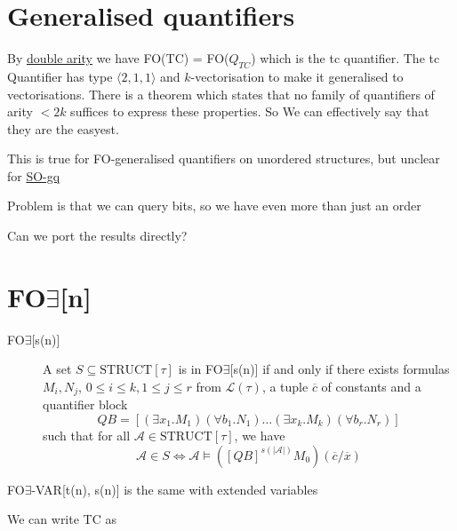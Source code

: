 \section{Generalised quantifiers}\label{generalised-quantifiers}

By \href{https://link.springer.com/article/10.1007/bf01268616}{double
arity} we have FO(TC) = FO(\(Q_{TC}\)) which is the tc quantifier. The
tc Quantifier has type \(\langle 2, 1 ,1 \rangle\) and
\(k\)-vectorisation to make it generalised to vectorisations. There is a
theorem which states that no family of quantifiers of arity \(<2k\)
suffices to express these properties. So We can effectively say that
they are the easyest.

This is true for FO-generalised quantifiers on unordered structures, but
unclear for \href{https://core.ac.uk/download/pdf/81931656.pdf}{SO-gq}

Problem is that we can query bits, so we have even more than just an
order

Can we port the results directly?

\section{\texorpdfstring{FO\(\exists\){[}n{]}}{FO\textbackslash exists{[}n{]}}}\label{foexistsn}

\begin{description}

\item[FO\(\exists\){[}s(n){]}]
A set \(S\subseteq \text{STRUCT}[\tau]\) is in FO\(\exists\){[}s(n){]}
if and only if there exists formulas \(M_{i}, N_{j}\),
\(0 \leq i \leq k, 1 \leq j \leq r\) from \(\mathcal{L}(\tau)\), a tuple
\(\overline{c}\) of constants and a quantifier block \[
QB = [(\exists x_{1}.M_{1})(\forall b_{1}.N_{1})\dots(\exists x_{k}.M_{k})(\forall b_{r}.N_{r})]
\] such that for all \(\mathcal{A} \in \text{STRUCT}[\tau]\), we have \[
\mathcal{A} \in S \Leftrightarrow \mathcal{A} \models ([QB]^{s(\left| \mathcal{A} \right|)}M_{0})(\overline{c} / \overline{x})
\]
\end{description}

FO\(\exists\)-VAR{[}t(n), s(n){]} is the same with extended variables

We can write TC as

